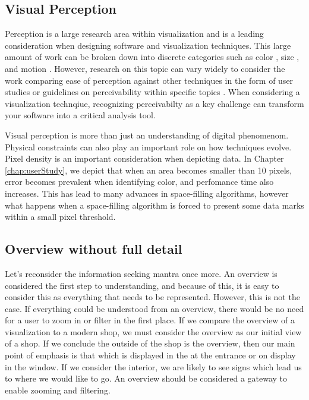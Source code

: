 \subsection{Visual Perception}
Perception is a large research area within visualization and is a leading consideration when designing software and visualization techniques. This large amount of work can be broken down into discrete categories such as color \cite{lee2013perceptually,heer2012color,szafir2018modeling}, size \cite{mcnabb2018when,borgo2014order,gramazio2014relation}, and motion \cite{simons2000current, driver1992motion, huber2005visualizing}. However, research on this topic can vary widely to consider the work comparing ease of perception against other techniques in the form of user studies \cite{rittschof1998learning} or guidelines on perceivability within specific topics \cite{kong2010perceptual}. When considering a visualization technqiue, recognizing perceivabilty as a key challenge can transform your software into a critical analysis tool. 

Visual perception is more than just an understanding of digital phenomenom. Physical constraints can also play an important role on how techniques evolve. Pixel density is an important consideration when depicting data. In Chapter \ref{chap:userStudy}, we depict that when an area becomes smaller than 10 pixels, error becomes prevalent when identifying color, and perfomance time also increases. This has lead to many advances in space-filling algorithms, however what happens when a space-filling algorithm is forced to present some data marks within a small pixel threshold. %


\subsection{Overview without full detail}
Let's reconsider the information seeking mantra once more. An overview is considered the first step to understanding, and because of this, it is easy to consider this as everything that needs to be represented. However, this is not the case. If everything could be understood from an overview, there would be no need for a user to zoom in or filter in the first place. If we compare the overview of a visualization to a modern shop, we must consider the overview as our initial view of a shop. If we conclude the outside of the shop is the overview, then our main point of emphasis is that which is displayed in the at the entrance or on display in the window. If we consider the interior, we are likely to see signs which lead us to where we would like to go. An overview should be considered a gateway to enable zooming and filtering.

